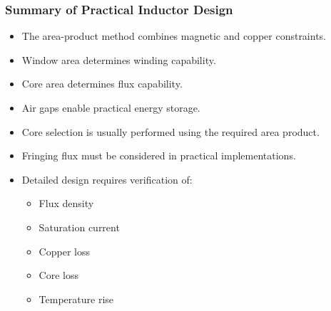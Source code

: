 \begin{frame} 
    \frametitle{Summary of Practical Inductor Design} 
    \begin{itemize} 
        \item The area-product method combines magnetic and copper constraints. 
        \item Window area determines winding capability. 
        \item Core area determines flux capability. 
        \item Air gaps enable practical energy storage. 
        \item Core selection is usually performed using the required area product. 
        \item Fringing flux must be considered in practical implementations. 
        \item Detailed design requires verification of:
        \begin{itemize} 
            \item Flux density 
            \item Saturation current 
            \item Copper loss 
            \item Core loss 
            \item Temperature rise 
        \end{itemize} 
    \end{itemize} 
\end{frame}


